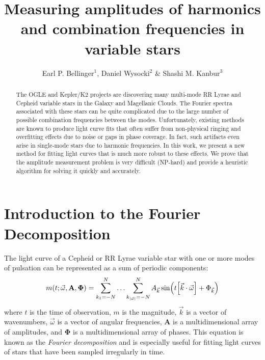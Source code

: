 \documentclass[11pt,twoside]{book}
\begin{document}
\pagestyle{myheadings}
\setcounter{equation}{0}\setcounter{figure}{0}\setcounter{footnote}{0}\setcounter{section}{0}\setcounter{table}{0}\setcounter{page}{1}
\title{Measuring amplitudes of harmonics and combination frequencies in variable stars}
\author{Earl P. Bellinger$^1$, Daniel Wysocki$^2$ \& Shashi M. Kanbur$^3$}

\begin{abstract}
The OGLE and Kepler/K2 projects are discovering many multi-mode RR Lyrae and Cepheid variable stars in the Galaxy and Magellanic Clouds. The Fourier spectra associated with these stars can be quite complicated due to the large number of possible combination frequencies between the modes. Unfortunately, existing methods are known to produce light curve fits that often suffer from non-physical ringing and overfitting effects due to noise or gaps in phase coverage. In fact, such artifacts even arise in single-mode stars due to harmonic frequencies. In this work, we present a new method for fitting light curves that is much more robust to these effects. We prove that the amplitude measurement problem is very difficult (NP-hard) and provide a heuristic algorithm for solving it quickly and accurately. 
\end{abstract}

\section{Introduction to the Fourier Decomposition}
The light curve of a Cepheid or RR Lyrae variable star with one or more modes of pulsation can be represented as a sum of periodic components:
\begin{equation}
    m(t ; \vec \omega, \mathbf A, \boldsymbol \Phi) = \sum_{k_1={-N}}^N \ldots \sum_{k_{|\vec \omega|}={-N}}^N A_{\vec k} \sin(t\qty[\vec k\cdot \vec \omega] + \Phi_{\vec k})
\end{equation}
where $t$ is the time of observation, $m$ is the magnitude, $\vec k$ is a vector of wavenumbers, $\vec \omega$ is a vector of angular frequencies, $\mathbf A$ is a multidimensional array of amplitudes, and $\boldsymbol \Phi$ is a multidimensional array of phases. This equation is known as the \emph{Fourier decomposition} and is especially useful for fitting light curves of stars that have been sampled irregularly in time. 
\end{document}
